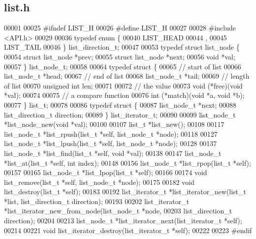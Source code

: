 \subsection{list.\+h}
\label{list_8h_source}

\begin{DoxyCode}
00001 
00025 \textcolor{preprocessor}{#ifndef LIST\_H}
00026 \textcolor{preprocessor}{#define LIST\_H}
00027 
00028 \textcolor{preprocessor}{#include <API.h>}
00029 
00036 \textcolor{keyword}{typedef} \textcolor{keyword}{enum} \{
00040             LIST_HEAD
00044     ,
00045     LIST_TAIL
00046 \} list_direction_t;
00047 
00053 \textcolor{keyword}{typedef} \textcolor{keyword}{struct }list_node \{
00054   \textcolor{keyword}{struct }list_node *prev;
00055   \textcolor{keyword}{struct }list_node *next;
00056   \textcolor{keywordtype}{void} *val;
00057 \} list_node_t;
00058 
00064 \textcolor{keyword}{typedef} \textcolor{keyword}{struct }\{
00065     \textcolor{comment}{// start of list}
00066     list_node_t *head;
00067     \textcolor{comment}{// end of list}
00068     list_node_t *tail;
00069     \textcolor{comment}{// length of list}
00070     \textcolor{keywordtype}{unsigned} \textcolor{keywordtype}{int} len;
00071 
00072     \textcolor{comment}{// the value}
00073     void (*free)(\textcolor{keywordtype}{void} *val);
00074 
00075     \textcolor{comment}{// a compare function}
00076     int (*match)(\textcolor{keywordtype}{void} *a, \textcolor{keywordtype}{void} *b);
00077 \} list_t;
00078 
00086 \textcolor{keyword}{typedef} \textcolor{keyword}{struct }\{
00087   list_node_t *next;
00088   list_direction_t direction;
00089 \} list_iterator_t;
00090 
00099 list_node_t *list_node_new(\textcolor{keywordtype}{void} *val);
00100 
00107 list_t *list_new();
00108 
00117 list_node_t *list_rpush(list_t *\textcolor{keyword}{self}, list_node_t *node);
00118 
00127 list_node_t *list_lpush(list_t *\textcolor{keyword}{self}, list_node_t *node);
00128 
00137 list_node_t *list_find(list_t *\textcolor{keyword}{self}, \textcolor{keywordtype}{void} *val);
00138 
00147 list_node_t *list_at(list_t *\textcolor{keyword}{self}, \textcolor{keywordtype}{int} index);
00148 
00156 list_node_t *list_rpop(list_t *\textcolor{keyword}{self});
00157 
00165 list_node_t *list_lpop(list_t *\textcolor{keyword}{self});
00166 
00174 \textcolor{keywordtype}{void} list_remove(list_t *\textcolor{keyword}{self}, list_node_t *node);
00175 
00182 \textcolor{keywordtype}{void} list_destroy(list_t *\textcolor{keyword}{self});
00183 
00192 list_iterator_t *list_iterator_new(list_t *list, list_direction_t direction);
00193 
00202 list_iterator_t *list_iterator_new_from_node(list_node_t *node,
00203                                              list_direction_t direction);
00204 
00213 list_node_t *list_iterator_next(list_iterator_t *\textcolor{keyword}{self});
00214 
00221 \textcolor{keywordtype}{void} list_iterator_destroy(list_iterator_t *\textcolor{keyword}{self});
00222 
00223 \textcolor{preprocessor}{#endif}
\end{DoxyCode}

